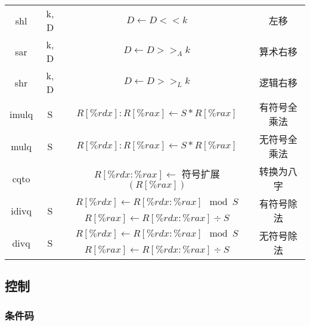 \begin{table}[H]
\begin{tabular}{|c c|c|c|}
        shl                               & k, D               & $D \leftarrow D << k$                        & 左移                     \\
        sar                               & k, D               & $D \leftarrow D >>_A k$                      & 算术右移                   \\
        shr                               & k, D               & $D \leftarrow D >>_L k$                      & 逻辑右移                   \\
        \hline
        imulq                             & S                  & $R[\%rdx]:R[\%rax] \leftarrow S * R[\%rax]$  & 有符号全乘法                 \\
        mulq                              & S                  & $R[\%rdx]:R[\%rax] \leftarrow S * R[\%rax]$  & 无符号全乘法                 \\
        \hline
        cqto                              &                    & $R[\%rdx:\%rax] \leftarrow$ 符号扩展$(R[\%rax])$ & 转换为八字                  \\
        \hline
        \multirow{2}{*}{idivq}            & \multirow{2}{*}{S} & $R[\%rdx] \leftarrow R[\%rdx:\%rax] \mod S$  & \multirow{2}{*}{有符号除法} \\
                                          &                    & $R[\%rax] \leftarrow R[\%rdx:\%rax] \div S$  &                        \\
        \hline
        \multirow{2}{*}{divq}             & \multirow{2}{*}{S} & $R[\%rdx] \leftarrow R[\%rdx:\%rax] \mod S$  & \multirow{2}{*}{无符号除法} \\
                                          &                    & $R[\%rax] \leftarrow R[\%rdx:\%rax] \div S$  &                        \\
        \hline
    \end{tabular}
\end{table}

\subsection{控制}
\subsubsection{条件码}
